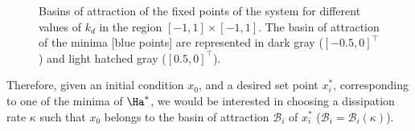 %
\begin{figure*}[h]
	\centering
	\caption{Basins of attraction of the fixed points of the system for different values of $k_d$ in the region $[-1,1]\times [-1,1]$. The basin of attraction of the minima [blue points] are represented in dark gray ($[-0.5,0]^\top$) and light hatched gray ($[0.5,0]^\top$).}
	\label{fig:basin}
\end{figure*}
%
\iffalse
{\color{red}
Therefore, given an initial condition $x_0$, and a desired set point $x_i^*$, corresponding to one of the minima of $\Ha^*$, we would be interested in choosing a dissipation rate $\kappa$ such that $x_0$ 
belongs to the basin of attraction $\mathcal{B}_i$ of $x_i^*$ ($\mathcal{B}_i = \mathcal{B}_i(\kappa)$). 
}
